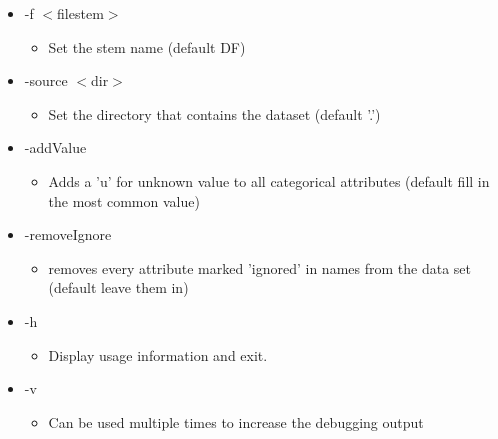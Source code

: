 \begin{itemize}
\item -f $<$filestem$>$\begin{itemize}
\item Set the stem name (default DF)\end{itemize}
\item -source $<$dir$>$\begin{itemize}
\item Set the directory that contains the dataset (default '.')\end{itemize}
\item -add\-Value\begin{itemize}
\item Adds a 'u' for unknown value to all categorical attributes (default fill in the most common value)\end{itemize}
\item -remove\-Ignore\begin{itemize}
\item removes every attribute marked 'ignored' in names from the data set (default leave them in)\end{itemize}
\item -h\begin{itemize}
\item Display usage information and exit.\end{itemize}
\item -v\begin{itemize}
\item Can be used multiple times to increase the debugging output\end{itemize}
\end{itemize}


